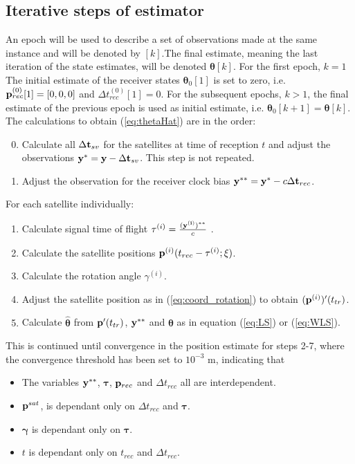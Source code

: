 \subsection{Iterative steps of estimator}\label{iterativeModel}
An epoch will be used to describe a set of observations made at the same instance and will be denoted by $[k]$.The final estimate, meaning the last iteration of the state estimates, will be denoted ${\boldsymbol \theta}[k]$. For the first epoch, $k=1$ The initial estimate of the receiver states ${\boldsymbol \theta}_0[1]$ is set to zero, i.e. ${\bf p}^{(0)}_{rec}[1]=[0, 0, 0]$ and $\Delta t^{(0)}_{rec}[1]=0$. For the subsequent epochs, $k>1$, the final estimate of the previous epoch is used as initial estimate, i.e. ${\boldsymbol \theta}_0[k+1]={\boldsymbol \theta}[k]$.
The calculations to obtain (\ref{eq:thetaHat}) are in the order:
\begin{enumerate}
\setcounter{enumi}{-1}
\item Calculate all $\Delta {\bf t}_{sv}$ for the satellites at time of reception $t$ and adjust the observations ${\bf y}^*= {\bf y} -\Delta {\bf t}_{sv}$. This step is not repeated.
\end{enumerate}
\begin{enumerate}
\item Adjust the observation for the receiver clock bias ${\bf y}^{**}={\bf y}^*-c\Delta {\bf t}_{rec}$.
\end{enumerate}
For each satellite individually:
\begin{enumerate}
\addtolength{\itemindent}{1cm}
\setcounter{enumi}{1}
\item Calculate signal time of flight $\tau^{(i)}=\frac{(\bf y^{(i)})^{**}}{c}$ .
\item Calculate the satellite positions ${\bf p}^{(i)}(t_{rec}-\tau^{(i)};\xi)$.
\item Calculate the rotation angle $\gamma^{(i)}$.
\item Adjust the satellite position as in (\ref{eq:coord_rotation}) to obtain $({\bf p}^{(i)})'(t_{tr})$.
\item Calculate $\hat{{\boldsymbol \theta}}$ from ${\bf p}'(t_{tr})$, $\bf y^{**}$ and $\boldsymbol \theta$ as in equation (\ref{eq:LS}) or (\ref{eq:WLS}). 
\end{enumerate}
This is continued until convergence in the position estimate for steps 2-7, where the convergence threshold has been set to $10^{-3}$ m, indicating that
\begin{itemize}
\item The variables ${\bf y}^{**}$, $\boldsymbol \tau$, ${\bf p}_{rec}$ and $\Delta t_{rec}$ all are interdependent.
\item ${\bf p}^{sat}$, is dependant only on $\Delta t_{rec}$ and $\boldsymbol \tau$. 
\item $\boldsymbol \gamma$ is dependant only on $\boldsymbol \tau$.
\item $t$ is dependant only on $t_{rec}$ and $\Delta t_{rec}$.
\end{itemize}


